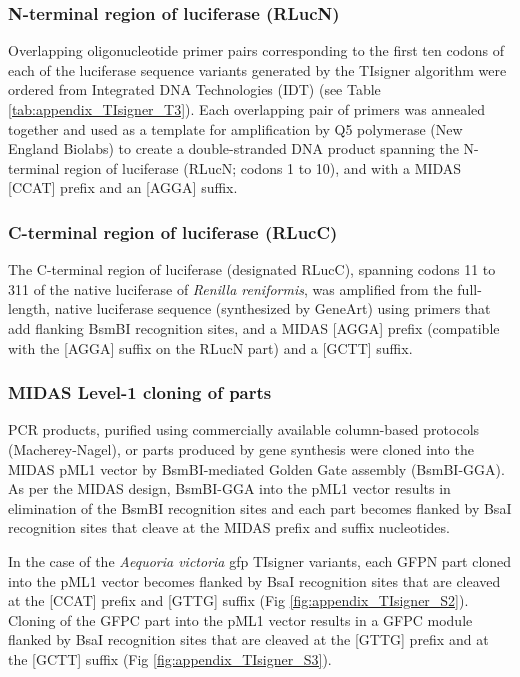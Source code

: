 \subsubsection{N-terminal region of luciferase (RLucN)}
Overlapping oligonucleotide primer pairs corresponding to the first ten codons of each of the luciferase sequence variants generated by the TIsigner algorithm were ordered from Integrated DNA Technologies (IDT) (see Table \ref{tab:appendix_TIsigner_T3}). Each overlapping pair of primers was annealed together and used as a template for amplification by Q5 polymerase (New England Biolabs) to create a double-stranded DNA product spanning the N-terminal region of luciferase (RLucN; codons 1 to 10), and with a MIDAS [CCAT] prefix and an [AGGA] suffix.

\subsubsection{C-terminal region of luciferase (RLucC)}
The C-terminal region of luciferase (designated RLucC), spanning codons 11 to 311 of the native luciferase of \textit{Renilla reniformis}, was amplified from the full-length, native luciferase sequence (synthesized by GeneArt) using primers that add flanking BsmBI recognition sites, and a MIDAS [AGGA] prefix (compatible with the [AGGA] suffix on the RLucN part) and a [GCTT] suffix.


\subsubsection{MIDAS Level-1 cloning of parts}
PCR products, purified using commercially available column-based protocols (Macherey-Nagel), or parts produced by gene synthesis were cloned into the MIDAS pML1 vector by BsmBI-mediated Golden Gate assembly (BsmBI-GGA). As per the MIDAS design, BsmBI-GGA into the pML1 vector results in elimination of the BsmBI recognition sites and each part becomes flanked by BsaI recognition sites that cleave at the MIDAS prefix and suffix nucleotides.

In the case of the \textit{Aequoria victoria} gfp TIsigner variants, each GFPN part cloned into the pML1 vector becomes flanked by BsaI recognition sites that are cleaved at the [CCAT] prefix and [GTTG] suffix (Fig \ref{fig:appendix_TIsigner_S2}). Cloning of the GFPC part into the pML1 vector results in a GFPC module flanked by BsaI recognition sites that are cleaved at the [GTTG] prefix and at the [GCTT] suffix (Fig \ref{fig:appendix_TIsigner_S3}).

